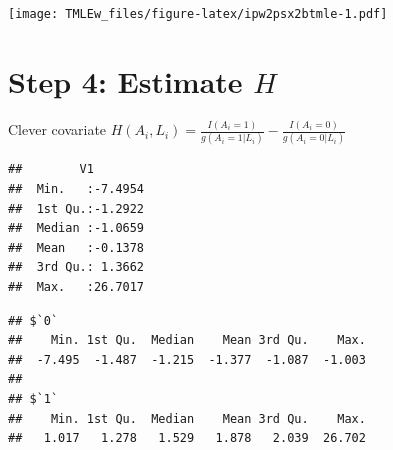 \documentclass[
]{book}
\newenvironment{Shaded}{\begin{snugshade}}{\end{snugshade}}
\newcommand{\DecValTok}[1]{\textcolor[rgb]{0.00,0.00,0.81}{#1}}
\newcommand{\FunctionTok}[1]{\textcolor[rgb]{0.00,0.00,0.00}{#1}}
\newcommand{\NormalTok}[1]{#1}
\newcommand{\OtherTok}[1]{\textcolor[rgb]{0.56,0.35,0.01}{#1}}
\newcommand{\SpecialCharTok}[1]{\textcolor[rgb]{0.00,0.00,0.00}{#1}}
\begin{document}
\texttt{[image: TMLEw\_files/figure-latex/ipw2psx2btmle-1.pdf]}

\hypertarget{step-4-estimate-h}{%
\section{\texorpdfstring{Step 4: Estimate \(H\)}{Step 4: Estimate H}}\label{step-4-estimate-h}}

Clever covariate \(H(A_i, L_i) = \frac{I(A_i=1)}{g(A_i=1|L_i)} - \frac{I(A_i=0)}{g(A_i=0|L_i)}\) \citep{luque2018targeted}

\begin{Shaded}
\end{Shaded}

\begin{verbatim}
##        V1         
##  Min.   :-7.4954  
##  1st Qu.:-1.2922  
##  Median :-1.0659  
##  Mean   :-0.1378  
##  3rd Qu.: 1.3662  
##  Max.   :26.7017
\end{verbatim}

\begin{Shaded}
\end{Shaded}

\begin{verbatim}
## $`0`
##    Min. 1st Qu.  Median    Mean 3rd Qu.    Max. 
##  -7.495  -1.487  -1.215  -1.377  -1.087  -1.003 
## 
## $`1`
##    Min. 1st Qu.  Median    Mean 3rd Qu.    Max. 
##   1.017   1.278   1.529   1.878   2.039  26.702
\end{verbatim}
\end{document}
